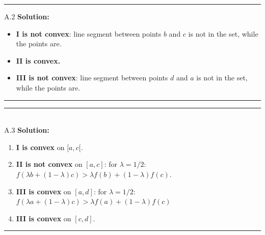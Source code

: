 \documentclass{article}
\newcommand{\1}{\mathbf{1}}
\begin{document}
\noindent\rule{\textwidth}{1pt}
A.2 {\bf Solution:}\\
\begin{itemize}
    \item {\bf I is not convex}: line segment between points $b$ and $c$ is not in the set, while the points are. 
    \item {\bf II is convex.} 
    \item {\bf III is not convex}: line segment between points $d$ and $a$ is not in the set, while the points are.
\end{itemize}
\noindent\rule{\textwidth}{1pt}

\noindent\rule{\textwidth}{1pt}
\\
A.3 {\bf Solution:}\\
\begin{enumerate}
    \item {\bf I is convex} on $[a,c[$.
    \item {\bf II is not convex} on $[a,c]$: for $\lambda = 1/2$: $f(\lambda b + (1-\lambda)c) > \lambda f(b) + (1-\lambda)f(c)$. 
    \item {\bf III is convex} on $[a,d]$: for $\lambda = 1/2$: $f(\lambda a + (1-\lambda)c) > \lambda f(a) + (1-\lambda)f(c)$
    \item {\bf III is convex} on $[c,d]$.
\end{enumerate}   
\noindent\rule{\textwidth}{1pt}
\end{document}
